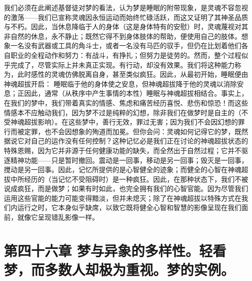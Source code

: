 我们必须在此阐述基督徒对梦的看法，认为梦是睡眠的附带现象，是灵魂不容忽视的激荡——我们已宣称灵魂因永恒运动而始终忙碌活跃，而这又证明了其神圣品质与不朽。因此，当休息降临于人的身体（这是身体特有的安慰）时，灵魂蔑视对其非自然的休息，永不静止；既然它得不到身体肢体的帮助，便使用自己的肢体。想象一名没有武器或工具的角斗士，或者一名没有马匹的驭手，但仍在比划着他们各自职业的全程动作和努力：有战斗，有挣扎；但努力是徒劳的。然而，整个过程似乎完成了，尽管实际上并未真正实现。有行动，却没有效果。我们将这种能力称为，此时感性的灵魂仿佛脱离自身，甚至类似疯狂。因此，从最初开始，睡眠便由神魂超拔开启：  睡眠临于他的身体使之安息，但神魂超拔降于他的灵魂以消除安息；正因此，通常（从秩序中产生事情的本性）睡眠与神魂超拔相结合。事实上，在我们的梦中，我们带着真实的情感、焦虑和痛苦经历喜悦、悲伤和惊恐！而这些情感本不应触动我们，因为梦不过是纯粹的幻想，除非我们在做梦时是自主的（不受神魂超拔影响）。在这些梦中，善行无效，罪过无害；因为我们不会因幻想的罪行而被定罪，也不会因想象的殉道而加冕。但你会问：灵魂如何记得它的梦，既然据说它对自己的运作没有任何控制？这种记忆必是我们正在讨论的神魂超拔状态的特殊恩赐，因为它并非源于任何健康功能的缺失，而全然出于自然过程；它并不驱逐精神功能——只是暂时撤回。震动是一回事，移动是另一回事；毁灭是一回事，搅动是另一回事。因此，记忆所提供的是心智健全的迹象；而健全的心智在神魂超拔中所经历的（当记忆不受阻碍时）是一种疯狂。因此，在那种状态下，我们不被说成疯狂，而是做梦；如果有时如此，也完全拥有我们的心智官能。因为尽管我们运用这些官能的能力可能变得黯淡，但并未熄灭；除了在神魂超拔以特殊方式在我们内运行之时，它本身似乎缺席，以致它既将健全心智和智慧的影像呈现在我们面前，就像它呈现错乱影像一样。\par


\section{第四十六章 梦与异象的多样性。轻看梦，而多数人却极为重视。梦的实例。}

